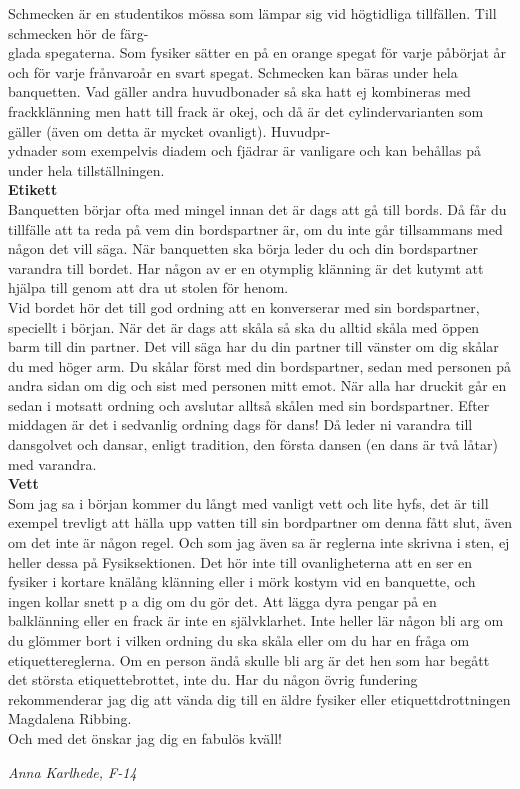 \documentclass[a6paper,12pt]{article}
\begin{document}
Schmecken är en studentikos mössa som lämpar sig vid högtidliga tillfällen. Till schmecken hör de färg-\\
glada spegaterna. Som fysiker sätter en på en orange spegat för varje påbörjat år och för varje frånvaroår en svart spegat. Schmecken kan bäras under hela banquetten. Vad gäller andra huvudbonader så ska hatt ej kombineras med frackklänning men hatt till frack är okej, och då är det cylindervarianten som gäller (även om detta är mycket ovanligt). Huvudpr-\\
ydnader som exempelvis diadem och fjädrar är vanligare och kan behållas på under hela tillställningen.\\
\normalsize\textbf{Etikett}\\
\footnotesize Banquetten börjar ofta med mingel innan det är dags att gå till bords. Då får du tillfälle att ta reda på vem din bordspartner är, om du inte går tillsammans med någon det vill säga. När banquetten ska börja leder du och din bordspartner varandra till bordet. Har någon av er en otymplig klänning är det kutymt att hjälpa till genom att dra ut stolen för henom.\\
Vid bordet hör det till god ordning att en konverserar med sin bordspartner, speciellt i början. När det är dags att skåla så ska du alltid skåla med öppen barm
\newpage
\setlength{\oddsidemargin}{-0.57in}
\noindent
till din partner. Det vill säga har du din partner till vänster om dig skålar du med höger arm. Du skålar först med din bordspartner, sedan med personen på andra sidan om dig och sist med personen mitt emot. När alla har druckit går en sedan i motsatt ordning och avslutar alltså skålen med sin bordspartner. Efter middagen är det i sedvanlig ordning dags för dans! Då leder ni varandra till dansgolvet och dansar, enligt tradition, den första dansen (en dans är två låtar) med varandra.\\
\normalsize\textbf{Vett}\\
\footnotesize Som jag sa i början kommer du långt med vanligt vett och lite hyfs, det är till exempel trevligt att hälla upp vatten till sin bordpartner om denna fått slut, även om det inte är någon regel. Och som jag även sa är reglerna inte skrivna i sten, ej heller dessa på Fysiksektionen. Det hör inte till ovanligheterna att en ser en fysiker i kortare knälång klänning eller i mörk kostym vid en banquette, och ingen kollar snett p a dig om du gör det. Att lägga dyra pengar på en balklänning eller en frack är inte en självklarhet. Inte heller lär någon bli arg om du glömmer bort i vilken ordning du ska skåla eller om du har en fråga om etiquettereglerna. Om en person ändå skulle bli arg är det hen som har begått det största etiquettebrottet, inte du. Har du någon övrig fundering rekommenderar jag dig att vända dig till en äldre fysiker eller etiquettdrottningen Magdalena Ribbing.\\
\indent Och med det önskar jag dig en fabulös kväll!
\begin{flushright}
\textit{Anna Karlhede, F-14}
\end{flushright}
\end{document}
